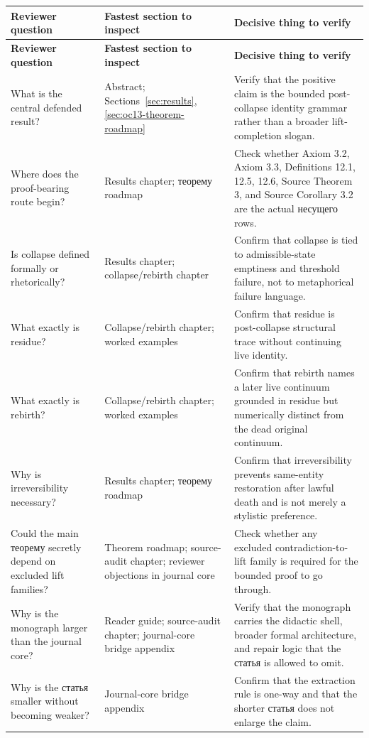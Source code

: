 \begin{longtable}{p{3.4cm} p{4.4cm} p{5.7cm}}
\toprule
\textbf{Reviewer question} & \textbf{Fastest section to inspect} & \textbf{Decisive thing to verify} \\
\midrule
\endfirsthead
\toprule
\textbf{Reviewer question} & \textbf{Fastest section to inspect} & \textbf{Decisive thing to verify} \\
\midrule
\endhead
\bottomrule
\endfoot
What is the central defended result? & Abstract; Sections~\ref{sec:results}, \ref{sec:oc13-theorem-roadmap} & Verify that the positive claim is the bounded post-collapse identity grammar rather than a broader lift-completion slogan. \\
Where does the proof-bearing route begin? & Results chapter; теорему roadmap & Check whether Axiom 3.2, Axiom 3.3, Definitions 12.1, 12.5, 12.6, Source Theorem 3, and Source Corollary 3.2 are the actual несущего rows. \\
Is collapse defined formally or rhetorically? & Results chapter; collapse/rebirth chapter & Confirm that collapse is tied to admissible-state emptiness and threshold failure, not to metaphorical failure language. \\
What exactly is residue? & Collapse/rebirth chapter; worked examples & Confirm that residue is post-collapse structural trace without continuing live identity. \\
What exactly is rebirth? & Collapse/rebirth chapter; worked examples & Confirm that rebirth names a later live continuum grounded in residue but numerically distinct from the dead original continuum. \\
Why is irreversibility necessary? & Results chapter; теорему roadmap & Confirm that irreversibility prevents same-entity restoration after lawful death and is not merely a stylistic preference. \\
Could the main теорему secretly depend on excluded lift families? & Theorem roadmap; source-audit chapter; reviewer objections in journal core & Check whether any excluded contradiction-to-lift family is required for the bounded proof to go through. \\
Why is the monograph larger than the journal core? & Reader guide; source-audit chapter; journal-core bridge appendix & Verify that the monograph carries the didactic shell, broader formal architecture, and repair logic that the статья is allowed to omit. \\
Why is the статья smaller without becoming weaker? & Journal-core bridge appendix & Confirm that the extraction rule is one-way and that the shorter статья does not enlarge the claim. \\

\end{longtable}
